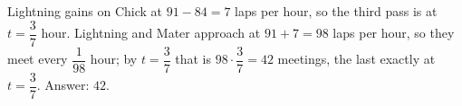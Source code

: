 Lightning gains on Chick at $91-84=7$ laps per hour, so the third pass is at $t=\dfrac{3}{7}$ hour. Lightning and Mater approach at $91+7=98$ laps per hour, so they meet every $\dfrac{1}{98}$ hour; by $t=\dfrac{3}{7}$ that is $98\cdot\dfrac{3}{7}=42$ meetings, the last exactly at $t=\dfrac{3}{7}$. Answer: $\boxed{42}$.
